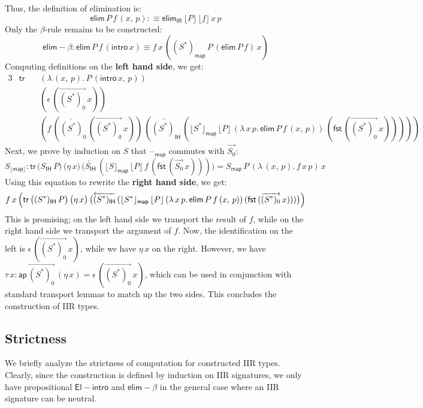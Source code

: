 \documentclass[acmsmall,screen,review,anonymous]{acmart}
\newcommand{\msf}[1]{{\mathsf{#1}}}
\newcommand{\blank}{{\mathord{\hspace{1pt}\text{--}\hspace{1pt}}}}
\newcommand{\IR}{\msf{IR}}
\newcommand{\intro}{\msf{intro}}
\newcommand{\IH}{\msf{IH}}
\newcommand{\map}{\msf{map}}
\newcommand{\elim}{\msf{elim}}
\newcommand{\tr}{\msf{tr}}
\newcommand{\fst}{\msf{fst}}
\newcommand{\floord}[1]{\lfloor #1 \rfloor}
\newcommand{\ora}[1]{\overrightarrow{#1}}
\newcommand{\ola}[1]{\overleftarrow{#1}}
\newcommand{\ap}{\msf{ap}}
\begin{document}
Thus, the definition of elimination is:
\[ \elim\,P\,f\,(x,\,p) :\equiv \elim_\IR\,\floord{P}\,\floord{f}\,x\,p \]
Only the $\beta$-rule remains to be constructed:
\[ \elim\!-\!\!\beta : \elim\,P\,f\,(\intro\,x) \equiv f\,x\,((S^*)_\map\,P\,(\elim\,P\,f)\,x) \]
Computing definitions on the \textbf{left hand side}, we get:
\begin{alignat*}{3}
  & \tr\, &&(\lambda\,(x,\,p).\,P\,(\intro\,x,\,p))\\
  &       &&(\epsilon\,(\ora{(S^*)_0}\,x))\\
  &       &&(f\,(\ola{(S^*)_0}\,(\ora{(S^*)_0}\,x))\,(\ola{(S^*)_\IH}\,(\floord{S^*}_\map\,\floord{P}\,(\lambda\,x\,p.\,\elim\,P\,f\,(x,\,p))\,(\fst\,(\ora{(S^*)_0}\,x)))))
\end{alignat*}
Next, we prove by induction on $S$ that $\blank_\map$ commutes with $\ora{S_0}$:
\[ S_{\floord{\map}} : \tr\,\bigl(S_\IH\,P\bigr)\,\bigl(\eta\,x\bigr)\,\bigl(\ola{S_\IH}\,(\floord{S}_\map\,\floord{P}\,f\,(\fst\,(\ora{S_0}\,x)))\bigr) = S_\map\,P\,(\lambda\,(x,\,p).\,f\,x\,p)\,x \]
Using this equation to rewrite the \textbf{right hand side}, we get:
\begin{alignat*}{3}
  f\,x\,\Bigl(\tr\,\bigl((S^*)_\IH\,P\bigr)\,\bigl(\eta\,x\bigr)\,\bigl(\ola{(S^*)_\IH}\,(\floord{S^*}_\map\,\floord{P}\,(\lambda\,x\,p.\,\elim\,P\,f\,(x,\,p))\,(\fst\,(\ora{(S^*)_0}\,x)))\bigr)\Bigr)
\end{alignat*}
This is promising; on the left hand side we transport the result of $f$, while on the right hand
side we transport the argument of $f$. Now, the identification on the left is
$\epsilon\,(\ora{(S^*)_0}\,x)$, while we have $\eta\,x$ on the right. However, we have $\tau\,x :
\ap\,\ora{(S^*)_0}\,(\eta\,x) = \epsilon\,(\ora{(S^*)_0}\,x)$, which can be used in conjunction with
standard transport lemmas to match up the two sides. This concludes the construction of IIR types.

\subsection{Strictness}
We briefly analyze the strictness of computation for constructed IIR types. Clearly, since the
construction is defined by induction on IIR signatures, we only have propositional
$\msf{El\!\!-\!\!intro}$ and $\elim\!-\!\!\beta$ in the general case where an IIR signature can be
neutral.
\end{document}
